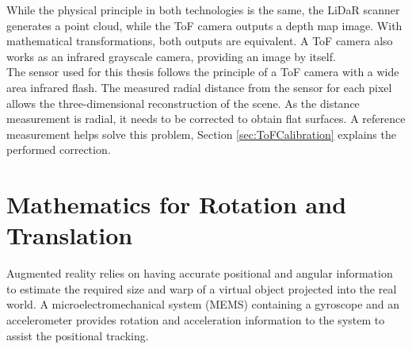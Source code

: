 While the physical principle in both technologies is the same, the LiDaR scanner generates a point cloud, while the ToF camera outputs a depth map image. With mathematical transformations, both outputs are equivalent. A ToF camera also works as an infrared grayscale camera, providing an image by itself.  \\
The sensor used for this thesis follows the principle of a ToF camera with a wide area infrared flash. The measured radial distance from the sensor for each pixel allows the three-dimensional reconstruction of the scene. As the distance measurement is radial, it needs to be corrected to obtain flat surfaces. A reference measurement helps solve this problem, Section \ref{sec:ToFCalibration} explains the performed correction.

\section{Mathematics for Rotation and Translation}
\label{sec:LinAlgRotation}
Augmented reality relies on having accurate positional and angular information to estimate the required size and warp of a virtual object projected into the real world. A microelectromechanical system (MEMS) containing a gyroscope and an accelerometer provides rotation and acceleration information to the system to assist the positional tracking.
